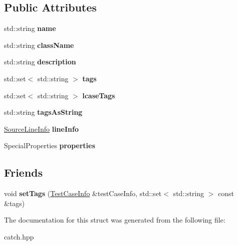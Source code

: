 \subsection*{Public Attributes}
\begin{DoxyCompactItemize}
\item 
\mbox{\label{structCatch_1_1TestCaseInfo_a463794e2f5cfead307c93efd134ade36}} 
std\+::string {\bfseries name}
\item 
\mbox{\label{structCatch_1_1TestCaseInfo_a1a5e0825132a38d091defdebbf2f8ce9}} 
std\+::string {\bfseries class\+Name}
\item 
\mbox{\label{structCatch_1_1TestCaseInfo_a37fe2db9425bc45f6a33893eac31198e}} 
std\+::string {\bfseries description}
\item 
\mbox{\label{structCatch_1_1TestCaseInfo_a045f62e7719a8760a5b456f7fd2dc97c}} 
std\+::set$<$ std\+::string $>$ {\bfseries tags}
\item 
\mbox{\label{structCatch_1_1TestCaseInfo_a0ed3864a313e8ddc3ae38431be5be9ae}} 
std\+::set$<$ std\+::string $>$ {\bfseries lcase\+Tags}
\item 
\mbox{\label{structCatch_1_1TestCaseInfo_ac65c2d36fd36f71e9bf782b2ea245c64}} 
std\+::string {\bfseries tags\+As\+String}
\item 
\mbox{\label{structCatch_1_1TestCaseInfo_aa9407b7f442655b51a2aad24b3fa2fd3}} 
\hyperlink{structCatch_1_1SourceLineInfo}{Source\+Line\+Info} {\bfseries line\+Info}
\item 
\mbox{\label{structCatch_1_1TestCaseInfo_afc1e84bd7a2e180895a06d9131302af0}} 
Special\+Properties {\bfseries properties}
\end{DoxyCompactItemize}
\subsection*{Friends}
\begin{DoxyCompactItemize}
\item 
\mbox{\label{structCatch_1_1TestCaseInfo_addc10c770e56f49da5baa0c76cf25bd5}} 
void {\bfseries set\+Tags} (\hyperlink{structCatch_1_1TestCaseInfo}{Test\+Case\+Info} \&test\+Case\+Info, std\+::set$<$ std\+::string $>$ const \&tags)
\end{DoxyCompactItemize}


The documentation for this struct was generated from the following file\+:\begin{DoxyCompactItemize}
\item 
catch.\+hpp\end{DoxyCompactItemize}
